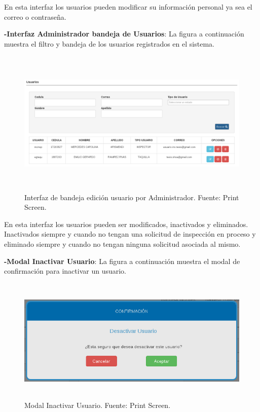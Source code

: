 En esta interfaz los usuarios pueden modificar su información personal ya sea el correo o contraseña.
\newpage

\textbf{-Interfaz Administrador bandeja de Usuarios}: La figura a continuación muestra el filtro y bandeja de los usuarios registrados en el sistema.

\begin{figure}[H]
\begin{center}
	\includegraphics[width=\textwidth,height=7cm]{img/interfaces/bandeja_edicion_usuarios.png}
\end{center}
\caption{Interfaz de bandeja edición usuario por Administrador. Fuente: Print Screen.}
\label{fig:interfaz_bandeja_edicion_usuario}
\end{figure}

En esta interfaz los usuarios pueden ser modificados, inactivados y eliminados. Inactivados siempre y cuando no tengan una solicitud de inspección en proceso y eliminado siempre y cuando no tengan ninguna solicitud asociada al mismo.



\textbf{-Modal Inactivar Usuario}: La figura a continuación muestra el modal de confirmación para inactivar un usuario.

\begin{figure}[H]
\begin{center}
	\includegraphics[width=14cm,height=6cm]{img/interfaces/modal_inactivar_usuario.png}
\end{center}
\caption{Modal Inactivar Usuario. Fuente: Print Screen.}
\label{fig:modal_confirmacion_inactivar_usuario}
\end{figure}

